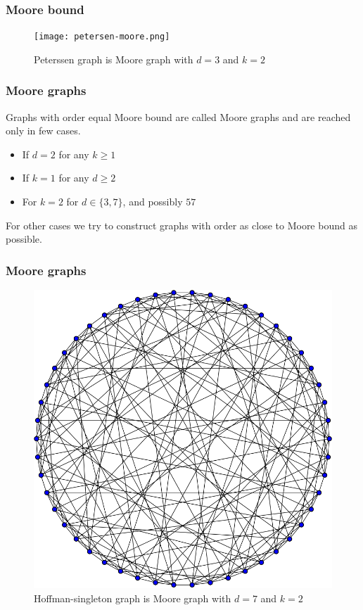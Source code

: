 \documentclass{beamer}
\begin{document}
\begin{frame}
	\frametitle{Moore bound}
		\begin{figure}[!ht]
    		\centering
    		\texttt{[image: petersen-moore.png]}
    		\caption{Peterssen graph is Moore graph with $d=3$ and $k=2$ }
		\end{figure}
\end{frame}
\begin{frame}
	\frametitle{Moore graphs}
	Graphs with order equal Moore bound are called Moore graphs and are reached only in few cases.	
	\begin{itemize}
		\item If $d = 2$ for any $k \geq 1$
		\item If $k = 1$ for any $d \geq 2$
		\item For $k = 2$ for $d \in \{3, 7 \}$, and possibly $57$
	\end{itemize}
	For other cases we try to construct graphs with order as close to Moore bound as possible.
\end{frame}
\begin{frame}
	\frametitle{Moore graphs}
	\begin{figure}[!ht]
 		\centering
 		\includegraphics[scale=0.25]{Hoffman-Singleton_graph.png}
		\caption{Hoffman-singleton graph is Moore graph with $d=7$ and $k=2$ }
	\end{figure}
\end{frame}
\end{document}
